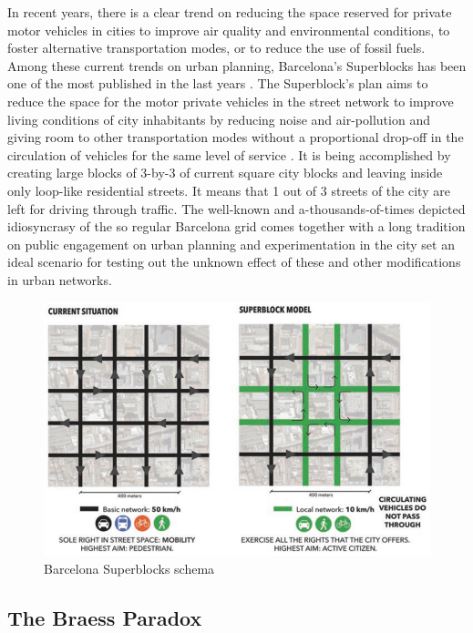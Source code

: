 \documentclass[11pt]{article}
\begin{document}
In recent years, there is a clear trend on reducing the space reserved for private motor vehicles in cities to improve air quality and environmental conditions, to foster alternative transportation modes, or to reduce the use of fossil fuels. Among these current trends on urban planning, Barcelona's Superblocks has been one of the most published in the last years \citep{Bausells2016, Hu2016, Morel2019, Wiedeman2018}. The Superblock's plan aims to reduce the space for the motor private vehicles in the street network to improve living conditions of city inhabitants by reducing noise and air-pollution and giving room to other transportation modes without a proportional drop-off in the circulation of vehicles for the same level of service \citep{Rueda2018}. It is being accomplished by creating large blocks of 3-by-3 of current square city blocks and leaving inside only loop-like residential streets. It means that 1 out of 3 streets of the city are left for driving through traffic. The well-known and a-thousands-of-times depicted idiosyncrasy of the so regular Barcelona grid comes together with a long tradition on public engagement on urban planning and experimentation in the city set an ideal scenario for testing out the unknown effect of these and other modifications in urban networks.

\begin{figure}[h]
\centering
\includegraphics[scale=0.5]{bcn_superblocks_rueda_2018.png}
\caption{Barcelona Superblocks schema \citep{Rueda2018}}
\label{fig:Barcelona Superblocks schema}
\end{figure}

\subsection {The Braess Paradox}
\end{document}
